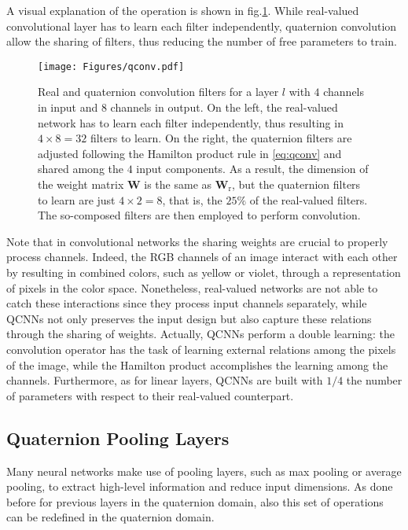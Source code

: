 \documentclass[graybox]{svmult}
\begin{document}
\noindent A visual explanation of the operation is shown in fig.\ref{fig:qconv}. While real-valued convolutional layer has to learn each filter independently, quaternion convolution allow the sharing of filters, thus reducing the number of free parameters to train.

\begin{figure}
    \centering
    \texttt{[image: Figures/qconv.pdf]}
    \caption{Real and quaternion convolution filters for a layer $l$ with $4$ channels in input and $8$ channels in output. On the left, the real-valued network has to learn each filter independently, thus resulting in $4 \times 8 = 32$ filters to learn. On the right, the quaternion filters are adjusted following the Hamilton product rule in \eqref{eq:qconv} and shared among the $4$ input components. As a result, the dimension of the weight matrix $\mathbf{W}$ is the same as $\mathbf{W}_{\text{r}}$, but the quaternion filters to learn are just $4 \times 2 = 8$, that is, the $25\%$ of the real-valued filters. The so-composed filters are then employed to perform convolution.}
    \label{fig:qconv}
\end{figure}

Note that in convolutional networks the sharing weights are crucial to properly process channels. Indeed, the RGB channels of an image interact with each other by resulting in combined colors, such as yellow or violet, through a representation of pixels in the color space. Nonetheless, real-valued networks are not able to catch these interactions since they process input channels separately, while QCNNs not only preserves the input design but also capture these relations through the sharing of weights.
Actually, QCNNs perform a double learning: the convolution operator has the task of learning external relations among the pixels of the image, while the Hamilton product accomplishes the learning among the channels.
Furthermore, as for linear layers, QCNNs are built with $1/4$ the number of parameters with respect to their real-valued counterpart.

\subsection{Quaternion Pooling Layers}
\noindent Many neural networks make use of pooling layers, such as max pooling or average pooling, to extract high-level information and reduce input dimensions. As done before for previous layers in the quaternion domain, also this set of operations can be redefined in the quaternion domain.
\end{document}
